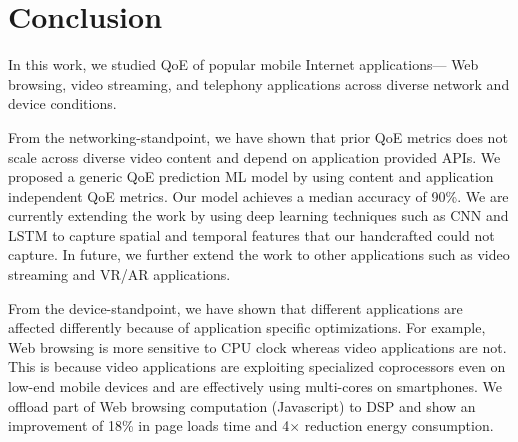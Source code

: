 \section{Conclusion}
In this work, we studied QoE of popular mobile Internet applications--- Web browsing, video streaming, and telephony applications across diverse network and device conditions.

From the networking-standpoint, we have shown that prior QoE metrics does not scale across diverse video content and depend on application provided APIs. 
We proposed a generic QoE prediction ML model by using content and application independent QoE metrics.
Our model achieves a median accuracy of 90\%.
We are currently extending the work by using deep learning techniques such as CNN and LSTM to capture spatial and temporal features that our handcrafted could not capture. 
In future, we further extend the work to other applications such as video streaming and VR/AR applications.

From the device-standpoint, we have shown that different applications are affected differently because of application specific optimizations.
For example, Web browsing is more sensitive to CPU clock whereas video applications are not. 
This is because video applications are exploiting specialized coprocessors even on low-end mobile devices and are effectively using multi-cores on smartphones.
We offload part of Web browsing computation (Javascript) to DSP and show an improvement of 18\% in page loads time and 4$\times$ reduction energy consumption.


